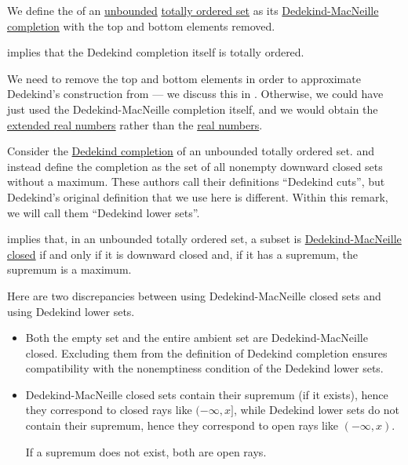 \begin{definition}\label{def:dedekind_completion}\mimprovised
  We define the  of an \hyperref[def:extremal_points/upper_and_lower_bounds]{unbounded} \hyperref[def:totally_ordered_set]{totally ordered set} as its \hyperref[def:dedekind_macnielle_completion]{Dedekind-MacNeille completion} with the top and bottom elements removed.
\end{definition}
\begin{comments}
  \item {} implies that the Dedekind completion itself is totally ordered.
  \item We need to remove the top and bottom elements in order to approximate Dedekind's construction from \cite[sec. I.IV]{Beman1901Dedekind} --- we discuss this in . Otherwise, we could have just used the Dedekind-MacNeille completion itself, and we would obtain the \hyperref[def:extended_real_numbers]{extended real numbers} rather than the \hyperref[def:real_numbers]{real numbers}.
\end{comments}

\begin{remark}\label{rem:dedekind_completion_through_dedekind_macneille_closures}
  Consider the \hyperref[def:dedekind_completion]{Dedekind completion} of an unbounded totally ordered set.  and  instead define the completion as the set of all nonempty downward closed sets without a maximum. These authors call their definitions \enquote{Dedekind cuts}, but Dedekind's original definition that we use here is different. Within this remark, we will call them \enquote{Dedekind lower sets}.

   implies that, in an unbounded totally ordered set, a subset is \hyperref[def:dedekind_macnielle_closure]{Dedekind-MacNeille closed} if and only if it is downward closed and, if it has a supremum, the supremum is a maximum.

  Here are two discrepancies between using Dedekind-MacNeille closed sets and using Dedekind lower sets.
  \begin{itemize}
    \item Both the empty set and the entire ambient set are Dedekind-MacNeille closed. Excluding them from the definition of Dedekind completion ensures compatibility with the nonemptiness condition of the Dedekind lower sets.

    \item Dedekind-MacNeille closed sets contain their supremum (if it exists), hence they correspond to closed rays like \( (-\infty, x] \), while Dedekind lower sets do not contain their supremum, hence they correspond to open rays like \( (-\infty, x) \).

    If a supremum does not exist, both are open rays.
  \end{itemize}
\end{remark}

